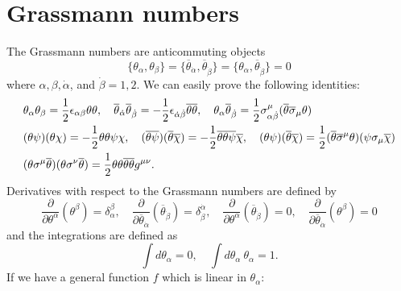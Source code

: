 \documentclass[12pt]{report}
\begin{document}
\section{Grassmann numbers}
The Grassmann numbers are anticommuting objects
\begin{equation}
\{\theta_{\alpha}, \theta_{\beta}\} = \{\overline{\theta}_{\dot{\alpha}}, \overline{\theta}_{\dot{\beta}}\} = \{\theta_{\alpha}, \overline{\theta}_{\dot{\beta}}\} = 0
\end{equation}
where $\alpha, \beta, \dot{\alpha}$, and $\dot{\beta} = 1, 2$.
We can easily prove the following identities:
\begin{align}
&\theta_{\alpha} \theta_{\beta} = \frac{1}{2} \epsilon_{\alpha \beta} \theta \theta, \quad 
\overline{\theta}_{\dot{\alpha}} \overline{\theta}_{\dot{\beta}} = -\frac{1}{2} \epsilon_{\dot{\alpha} \dot{\beta}} \overline{\theta} \overline{\theta}, \quad 
\theta_{\alpha} \overline{\theta}_{\dot{\beta}} = \frac{1}{2} \sigma^{\mu}_{\alpha \dot{\beta}} (\overline{\theta} \overline{\sigma}_{\mu} \theta) \notag \\
& (\theta \psi)(\theta \chi) = - \frac{1}{2}\theta \theta \psi \chi, \quad 
(\overline{\theta} \overline{\psi})(\overline{\theta} \overline{\chi}) = - \frac{1}{2} \overline{\theta} \overline{\theta} \overline{\psi} \overline{\chi}, \quad 
(\theta \psi)(\overline{\theta} \overline{\chi}) = \frac{1}{2}(\overline{\theta} \overline{\sigma}^{\mu} \theta)(\psi \sigma_{\mu} \overline{\chi}) \notag \\
& (\theta \sigma^{\mu} \overline{\theta})(\theta \sigma^{\nu} \overline{\theta}) = \frac{1}{2} \theta \theta \overline{\theta} \overline{\theta} g^{\mu \nu} .
\end{align}
Derivatives with respect to the Grassmann numbers are defined by
\begin{equation}
\frac{\partial}{\partial \theta^{\alpha}}(\theta^{\beta}) = \delta^{\beta}_{\alpha}, \quad
\frac{\partial}{\partial \overline{\theta}_{\dot{\alpha}}}(\overline{\theta}_{\dot{\beta}}) = \delta^{\dot{\alpha}}_{\dot{\beta}}, \quad 
\frac{\partial}{\partial \theta^{\alpha}}(\overline{\theta}_{\dot{\beta}}) = 0, \quad 
\frac{\partial}{\partial \overline{\theta}_{\dot{\alpha}}}(\theta^{\beta}) = 0
\end{equation}
and the integrations are defined as
\begin{equation}
\int d\theta_{\alpha} = 0, \quad 
\int d\theta_{\alpha} \ \theta_{\alpha}  = 1 .
\end{equation}
If we have a general function $f$ which is linear in $\theta_{\alpha}$:
\end{document}
